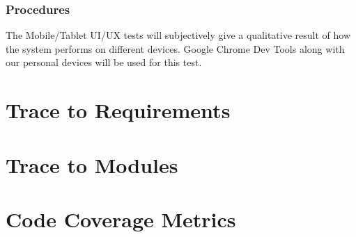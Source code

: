 \documentclass[12pt, titlepage]{article}
\begin{document}
\subsubsection{Procedures}
The Mobile/Tablet UI/UX tests will subjectively give a qualitative result of how the system performs on different devices. Google Chrome Dev Tools along with our personal devices will be used for this test.
		
\section{Trace to Requirements}
		
\section{Trace to Modules}		

\section{Code Coverage Metrics}




\end{document}
